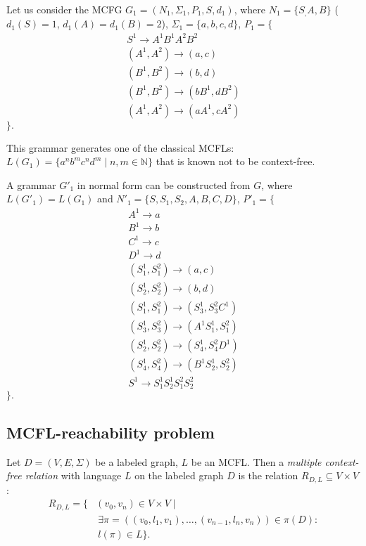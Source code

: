 Let us consider the MCFG $G_1 = (N_1, \Sigma_1, P_1, S, d_1)$, where $N_1 = \{S_, A, B\}$ ($d_1(S) = 1$, $d_1(A) = d_1(B) = 2$), $\Sigma_1 = \{a,b,c,d\}$, $P_1 = \{$
\begin{align*}
    S^1 \rightarrow A^1 B^1 A^2 B^2 \\
    (A^1, A^2) \rightarrow (a,c) \\
    (B^1, B^2) \rightarrow (b,d) \\
    (B^1, B^2) \rightarrow (bB^1, dB^2) \\
    (A^1, A^2) \rightarrow (aA^1, cA^2)
\end{align*}
$\}.$

This grammar generates one of the classical MCFLs: $L(G_1) = \{a^nb^mc^nd^m \mid n,m \in \mathbb{N}\}$ that is known not to be context-free.

A grammar $G'_1$ in normal form can be constructed from $G$, where $L(G'_1) = L(G_1)$ and $N'_1 = \{S, S_1, S_2, A, B, C, D\}$, $P'_1 = \{$
\begin{align*}
    A^1 \rightarrow a \\
    B^1 \rightarrow b \\
    C^1 \rightarrow c \\
    D^1 \rightarrow d \\
    (S_1^1, S_1^2) \rightarrow (a,c) \\
    (S_2^1, S_2^2) \rightarrow (b,d) \\
    (S_1^1, S_1^2) \rightarrow (S_3^1, S_3^2 C^1) \\
    (S_3^1, S_3^2) \rightarrow (A^1 S_1^1, S_1^2) \\
    (S_2^1, S_2^2) \rightarrow (S_4^1, S_4^2 D^1) \\
    (S_4^1, S_4^2) \rightarrow (B^1 S_2^1, S_2^2) \\
    S^1 \rightarrow S_1^1 S_2^1 S_1^2 S_2^2
\end{align*}
$\}.$

\subsection{MCFL-reachability problem}

\begin{definition}
Let $D = (V, E, \Sigma)$ be a labeled graph, $L$ be an MCFL. Then a \emph{multiple context-free relation} with language $L$ on the labeled graph $D$ is the relation $R_{D, L} \subseteq V \times V$:
\begin{equation*} \label{eq1}
\begin{split}
R_{D, L} = \{ &(v_0, v_n) \in V \times V  \mid \\ &\ \exists \pi = ((v_0, l_1, v_1), \ldots, (v_{n-1}, l_n, v_n)) \in \pi(D): \\
      &\ l(\pi) \in L \}.
\end{split}
\end{equation*}
\end{definition}

